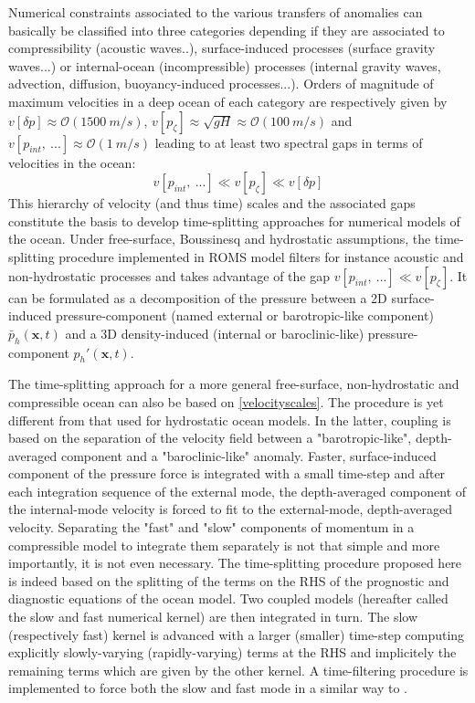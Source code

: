 Numerical constraints associated to the various transfers of anomalies can basically be classified into three categories depending if they are associated to compressibility (acoustic waves..), surface-induced processes (surface gravity waves...) or internal-ocean (incompressible) processes (internal gravity waves, advection, diffusion, buoyancy-induced processes...). Orders of magnitude of maximum velocities in a deep ocean of each category are respectively given by $v[\delta p]\approx \mathcal{O}(1500\ m/s)$, $v[p_\zeta]\approx\sqrt{g H}\approx \mathcal{O}(100\ m/s)$ and $v[p_{int},\ ...]\approx \mathcal{O}(1\ m/s)$ leading to at least two spectral gaps in terms of velocities in the ocean:
\begin{equation}
	\displaystyle
	\label{velocityscales}
	v[p_{int},\ ...] \ll v[p_\zeta] \ll v[\delta p]
\end{equation} 
This hierarchy of velocity (and thus time) scales and the associated gaps constitute the basis to develop time-splitting approaches for numerical models of the ocean.
Under free-surface, Boussinesq and hydrostatic assumptions, the time-splitting procedure implemented in ROMS model \citep{shchepetkin_regional_2005} filters for instance acoustic and non-hydrostatic processes and takes advantage of the gap $v[p_{int},\ ...] \ll v[p_\zeta]$. It can be formulated as a decomposition of the pressure between a 2D surface-induced pressure-component (named external or barotropic-like component) $\bar{p}_h(\mathbf{x},t)$ and a 3D density-induced (internal or baroclinic-like) pressure-component $p_h'(\mathbf{x},t)$. 

The time-splitting approach for a more general free-surface, non-hydrostatic and compressible ocean can also be based on \ref{velocityscales}. The procedure is yet different from that used for hydrostatic ocean models. In the latter, coupling is based on the separation of the velocity field between a "barotropic-like", depth-averaged component and a "baroclinic-like" anomaly. Faster, surface-induced component of the pressure force is integrated with a small time-step and after each integration sequence of the external mode, the depth-averaged component of the internal-mode velocity is forced to fit to the external-mode, depth-averaged velocity. Separating the "fast" and "slow" components of momentum in a compressible model to integrate them separately is not that simple and more importantly, it is not even necessary. The time-splitting procedure proposed here is indeed based on the splitting of the terms on the RHS of the prognostic and diagnostic equations of the ocean model. Two coupled models (hereafter called the slow and fast numerical kernel) are then integrated in turn. The slow (respectively fast) kernel is advanced with a larger (smaller) time-step computing explicitly slowly-varying (rapidly-varying) terms at the RHS and implicitely the remaining terms which are given by the other kernel. A time-filtering procedure is implemented to force both the slow and fast mode in a similar way to \citet{shchepetkin_regional_2005}.

